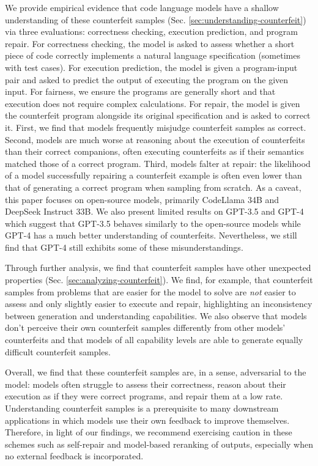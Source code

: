 We provide empirical evidence that code language models have a shallow understanding of these counterfeit samples (Sec. \ref{sec:understanding-counterfeit}) via three evaluations: correctness checking, execution prediction, and program repair. For correctness checking, the model is asked to assess whether a short piece of code correctly implements a natural language specification (sometimes with test cases). For execution prediction, the model is given a program-input pair and asked to predict the output of executing the program on the given input. For fairness, we ensure the programs are generally short and that execution does not require complex calculations. For repair, the model is given the counterfeit program alongside its original specification and is asked to correct it. First, we find that models frequently misjudge counterfeit samples as correct. Second, models are much worse at reasoning about the execution of counterfeits than their correct companions, often executing counterfeits as if their semantics matched those of a correct program. Third, models falter at repair: the likelihood of a model successfully repairing a counterfeit example is often even lower than that of generating a correct program when sampling from scratch. As a caveat, this paper focuses on open-source models, primarily CodeLlama 34B and DeepSeek Instruct 33B. We also present limited results on GPT-3.5 and GPT-4 which suggest that GPT-3.5 behaves similarly to the open-source models while GPT-4 has a much better understanding of counterfeits. Nevertheless, we still find that GPT-4 still exhibits some of these misunderstandings.

Through further analysis, we find that counterfeit samples have other unexpected properties
(Sec. \ref{sec:analyzing-counterfeit}). We find, for example, that counterfeit samples from problems that are easier for the model to solve are \textit{not} easier to assess and only slightly easier to execute and repair, highlighting an inconsistency between generation and understanding capabilities. We also observe that models don't perceive their own counterfeit samples differently from other models' counterfeits and that models of all capability levels are able to generate equally difficult counterfeit samples.

Overall, we find that these counterfeit samples are, in a sense, adversarial to the model: models often struggle to assess their correctness, reason about their execution as if they were correct programs, and repair them at a low rate. Understanding counterfeit samples is a prerequisite to many downstream applications in which models use their own feedback to improve themselves. Therefore, in light of our findings, we recommend exercising caution in these schemes such as self-repair and model-based reranking of outputs, especially when no external feedback is incorporated.
